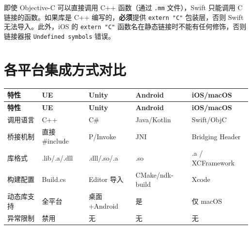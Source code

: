 \documentclass[12pt,a4paper,fontset=fandol]{ctexbook}
\newcommand{\cpp}[1]{C++#1}
\begin{document}
\begin{tcolorbox}[warning={extern "C" 在 Apple 平台上的必要性}]
即使 Objective-C 可以直接调用 \cpp{} 函数（通过 \texttt{.mm} 文件），Swift 只能调用 C 链接的函数。如果库是 \cpp{} 编写的，\textbf{必须}提供 \texttt{extern "C"} 包装层，否则 Swift 无法导入。此外，iOS 的 \texttt{extern "C"} 函数名在静态链接时不能有任何修饰，否则链接器报 \texttt{Undefined symbols} 错误。
\end{tcolorbox}

\section{各平台集成方式对比}

\begin{longtable}{l>{\raggedright\arraybackslash}p{2.6cm}>{\raggedright\arraybackslash}p{2.6cm}>{\raggedright\arraybackslash}p{2.6cm}>{\raggedright\arraybackslash}p{2.6cm}}
\toprule
\textbf{特性} & \textbf{UE} & \textbf{Unity} & \textbf{Android} & \textbf{iOS/macOS} \\
\midrule
\endfirsthead
\toprule
\textbf{特性} & \textbf{UE} & \textbf{Unity} & \textbf{Android} & \textbf{iOS/macOS} \\
\midrule
\endhead
调用语言    & \cpp{}       & C\#          & Java/Kotlin  & Swift/ObjC \\
桥接机制    & 直接 \#include & P/Invoke   & JNI          & Bridging Header \\
库格式      & .lib/.a/.dll & .dll/.so/.a & .so          & .a / XCFramework \\
构建配置    & Build.cs     & Editor 导入 & CMake/\allowbreak{}\allowbreak{}ndk-\allowbreak{}build & Xcode \\
动态库支持  & 全平台       & 桌面+Android & 是           & 仅 macOS \\
异常限制    & 禁用         & 无           & 无           & 无 \\
\bottomrule
\end{longtable}
\end{document}
